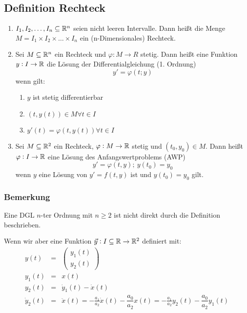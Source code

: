 \subsection{Definition Rechteck}
\begin{enumerate}[label= (\alph*)]
    \item $I_1, I_2, \ldots, I_n \subseteq \mathbb{R}^n$ seien nicht leeren Intervalle.
        Dann heißt die Menge $M = I_1 \times I_2 \times \ldots \times I_n$
        ein (n-Dimensionales) Rechteck.
    \item Sei $M \subseteq \mathbb{R}^n$ ein Rechteck und $\varphi: M \rightarrow R$ stetig.
        Dann heißt eine Funktion $y: I \rightarrow \mathbb{R}$ die Lösung
        der Differentialgleichung (1. Ordnung)
        \begin{equation*}
            y' = \varphi(t;y)
        \end{equation*}
        wenn gilt:
        \begin{enumerate}[label=\roman*]
            \item $y$ ist stetig differentierbar
            \item $(t,y(t)) \in M \forall t \in I$
            \item $y'(t) = \varphi(t, y(t)) \forall t \in I$
        \end{enumerate}
    \item Sei $M \subseteq \mathbb{R}^2$ ein Rechteck, $\varphi: M \rightarrow \mathbb{R}$
        stetig und $(t_0, y_0) \in M$. Dann heißt $\varphi: I \rightarrow \mathbb{R}$
        eine Lösung des Anfangswertproblems (AWP)
        \begin{equation*}
            y' = \varphi(t,y);\ y(t_0)=y_0
        \end{equation*}
        wenn $y$ eine Lösung von $y'=f(t,y)$ ist und $y(t_0)=y_0$ gilt.
\end{enumerate}

\subsubsection{Bemerkung}
Eine DGL $n$-ter Ordnung mit $n \geq 2$ ist nicht direkt durch die
Definition beschrieben.

Wenn wir aber eine Funktion $\vec{y}: I \subseteq \mathbb{R} \rightarrow \mathbb{R}^2$ definiert
mit:
\begin{eqnarray*}
    y(t) &=& \left( \begin{array}{c}y_1(t)\\y_2(t)\end{array} \right)\\
    y_1(t) &=& x(t)\\
    y_2(t) &=& \dot{y}_1(t) - \dot{x}(t)\\
    \dot{y}_2(t) &=& \ddot{x}(t) = -\frac{a_1}{a_2}\dot{x}(t)-
        \dfrac{a_0}{a_2}x(t) = -\frac{a_1}{a_2}y_2(t)-
        \dfrac{a_0}{a_2}y_1(t)
\end{eqnarray*}

